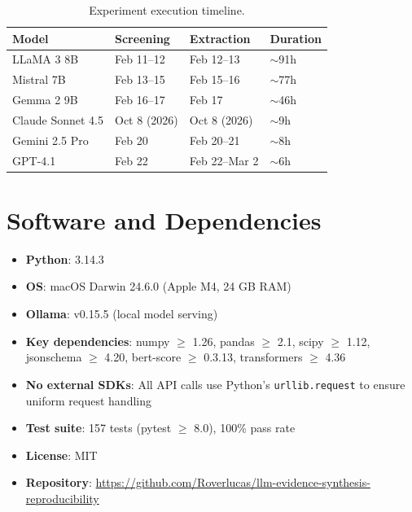 \documentclass[11pt]{article}
\newenvironment{fittab}{\begin{lrbox}{\fittabbox}}{\end{lrbox}%
  \ifdim\wd\fittabbox>\linewidth\resizebox{\linewidth}{!}{\usebox{\fittabbox}}\else\usebox{\fittabbox}\fi}
\begin{document}
\begin{table}[htbp]
\centering
\caption{Experiment execution timeline.}
\begin{fittab}\begin{tabular}{llll}
\toprule
\textbf{Model} & \textbf{Screening} & \textbf{Extraction} & \textbf{Duration} \\
\midrule
LLaMA 3 8B      & Feb 11--12 & Feb 12--13 & $\sim$91h \\
Mistral 7B       & Feb 13--15 & Feb 15--16 & $\sim$77h \\
Gemma 2 9B       & Feb 16--17 & Feb 17     & $\sim$46h \\
Claude Sonnet 4.5 & Oct 8 (2026) & Oct 8 (2026) & $\sim$9h \\
Gemini 2.5 Pro   & Feb 20    & Feb 20--21 & $\sim$8h \\
GPT-4.1          & Feb 22    & Feb 22--Mar 2 & $\sim$6h \\
\bottomrule
\end{tabular}\end{fittab}
\end{table}

\section{Software and Dependencies}
\label{sec:software}

\begin{itemize}
  \item \textbf{Python}: 3.14.3
  \item \textbf{OS}: macOS Darwin 24.6.0 (Apple M4, 24 GB RAM)
  \item \textbf{Ollama}: v0.15.5 (local model serving)
  \item \textbf{Key dependencies}: numpy $\geq$ 1.26, pandas $\geq$ 2.1, scipy $\geq$ 1.12, jsonschema $\geq$ 4.20, bert-score $\geq$ 0.3.13, transformers $\geq$ 4.36
  \item \textbf{No external SDKs}: All API calls use Python's \texttt{urllib.request} to ensure uniform request handling
  \item \textbf{Test suite}: 157 tests (pytest $\geq$ 8.0), 100\% pass rate
  \item \textbf{License}: MIT
  \item \textbf{Repository}: \url{https://github.com/Roverlucas/llm-evidence-synthesis-reproducibility}
\end{itemize}
\end{document}
